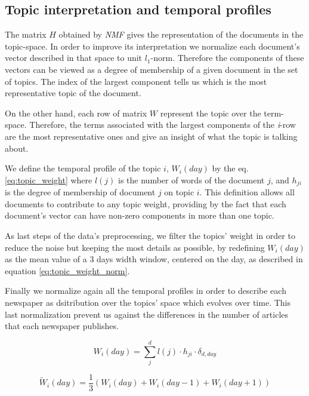 \documentclass{bmcart}
\begin{document}
\begin{backmatter}
\subsection*{Topic interpretation and temporal profiles}
\par The matrix $H$ obtained by \textit{NMF} gives the representation of the documents in the topic-space. In order to improve its interpretation we normalize each document's vector described in that space to unit $l_1$-norm. Therefore the components of these vectors can be viewed as a degree of membership of a given document in the set of topics. The index of the largest component tells us which is the most representative topic of the document.
\par On the other hand, each row of matrix $W$ represent the topic over the term-space. Therefore, the terms associated with the largest components of the \textit{i}-row are the most representative ones and give an insight of what the topic is talking about.
\par We define the temporal profile of the topic $i$, $W_i(day)$ by the eq. \ref{eq:topic_weight} where $l(j)$ is the number of words of the document $j$, and $h_{ji}$ is the degree of membership of document $j$ on topic $i$. This definition allows all documents to contribute to any topic weight, providing by the fact that each document's vector can have non-zero components in more than one topic.
\par As last steps of the data's preprocessing, we filter the topics' weight in order to reduce the noise but keeping the most details as possible, by redefining $W_i(day)$ as the mean value of a 3 days width window, centered on the day, as described in equation \ref{eq:topic_weight_norm}. 
\par Finally we normalize again all the temporal profiles in order to describe each newspaper as dsitribution over the topics' space which evolves over time. This last normalization prevent us against the differences in the number of articles that each newspaper publishes.

\begin{equation}
W_i(day) = \sum_j^d l(j) \cdot h_{ji} \cdot \delta_{d,day}
\label{eq:topic_weight}
\end{equation}

\begin{equation}
\tilde{W}_i(day) = \frac{1}{3} ({W}_i(day) + {W}_i(day - 1) + W_i(day + 1))
\label{eq:topic_weight_norm}
\end{equation}



\end{backmatter}
\end{document}
